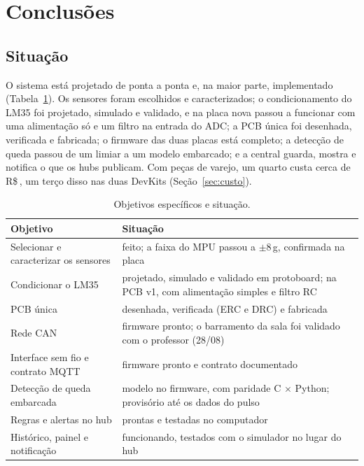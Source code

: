 \section{Conclusões}\label{sec:conclusoes}
\subsection{Situação}

O sistema está projetado de ponta a ponta e, na maior parte, implementado
(Tabela~\ref{tab:objetivos}). Os sensores foram escolhidos e caracterizados; o condicionamento
do LM35 foi projetado, simulado e validado, e na placa nova passou a funcionar com uma
alimentação só e um filtro na entrada do ADC; a PCB única foi desenhada, verificada e
fabricada; o firmware das duas placas está completo; a detecção de queda
passou de um limiar a um modelo embarcado; e a central guarda, mostra e notifica o que os hubs
publicam. Com peças de varejo, um quarto custa cerca de R\$\,\custoKit, um terço disso nas
duas DevKits (Seção~\ref{sec:custo}).

\begin{table}[H]
\centering
\caption{Objetivos específicos e situação.}
\label{tab:objetivos}
\small
\begin{tabular}{@{}>{\raggedright\arraybackslash}p{6.4cm}>{\raggedright\arraybackslash}p{7.4cm}@{}}
\toprule
Objetivo & Situação \\
\midrule
Selecionar e caracterizar os sensores & feito; a faixa do MPU passou a $\pm$8\,g, confirmada na placa \\
Condicionar o LM35 & projetado, simulado e validado em protoboard; na PCB v1, com alimentação simples e filtro RC \\
PCB única & desenhada, verificada (ERC e DRC) e fabricada \\
Rede CAN & firmware pronto; o barramento da sala foi validado com o professor (28/08) \\
Interface sem fio e contrato MQTT & firmware pronto e contrato documentado \\
Detecção de queda embarcada & modelo no firmware, com paridade C $\times$ Python; provisório até os dados do pulso \\
Regras e alertas no hub & prontas e testadas no computador \\
Histórico, painel e notificação & funcionando, testados com o simulador no lugar do hub \\
\bottomrule
\end{tabular}
\end{table}

